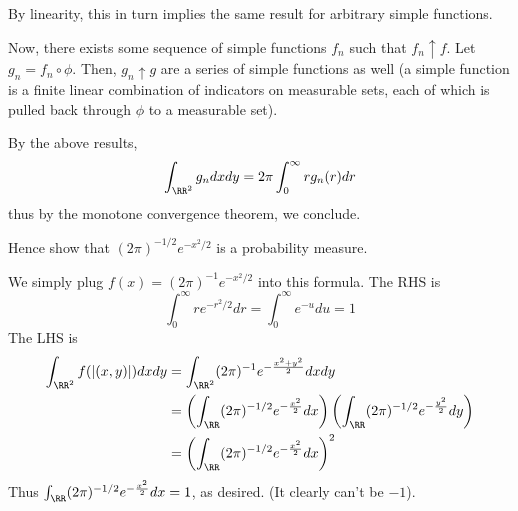 \documentclass[11pt, headheight=30pt]{scrartcl}
\begin{document}
By linearity, this in turn implies the same result for arbitrary
simple functions.

Now, there exists some sequence of simple functions $f_n$ such that
$f_n\uparrow f$. Let $g_n = f_n\circ \phi$. Then, $g_n\uparrow g$ are
a series of simple functions as well (a simple function is a finite linear
combination of indicators on measurable sets, each of which is pulled back
through $\phi$ to a measurable set).

By the above results,
\[
    \int_{\RR^2} g_n dxdy = 2\pi \int_0^\infty rg_n(r)dr    
\]
thus by the monotone convergence theorem, we conclude.

\begin{prob}
    Hence show that $(2\pi)^{-1/2} e^{-x^2/2}$ is a probability measure.
\end{prob}

We simply plug $f(x) = (2\pi)^{-1} e^{-x^2/2}$ into this formula.
The RHS is
\[
    \int_0^\infty re^{-r^2/2}dr = \int_0^\infty e^{-u}du = 1
\]
The LHS is
\begin{align*}
    \int_{\RR^2} f(|(x, y)|)dxdy &= \int_{\RR^2} (2\pi)^{-1} e^{-\frac{x^2 + y^2}{2}}dxdy\\
    &= \left(\int_\RR (2\pi)^{-1/2} e^{-\frac{x^2}{2}}dx\right)\left(\int_\RR (2\pi)^{-1/2} e^{-\frac{y^2}{2}}dy\right)\\
    &= \left(\int_\RR (2\pi)^{-1/2} e^{-\frac{x^2}{2}}dx\right)^2
\end{align*}
Thus $\int_\RR (2\pi)^{-1/2} e^{-\frac{x^2}{2}}dx = 1$, as desired.
(It clearly can't be $-1$).


\end{document}
